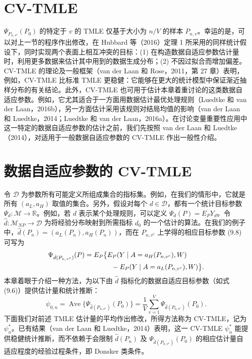\section{CV-TMLE}

$\Psi_{P_{n,v^c}}(P_0)$ 的特定于 $v$ 的 TMLE 仅基于大小为 $n/V$ 的样本 $P_{n,v}$。幸运的是，可以对上一节的程序作出修改，在 Hubbard 等（2016）定理 1 所采用的同样统计假设下，同时实现两个表面上相互冲突的目标：(1) 在构造数据自适应参数估计量时，利用更多数据来估计其中用到的数据生成分布；(2) 不因过拟合而增加偏差。CV-TMLE 的理论及一般框架（van der Laan 和 Rose，2011，第 27 章）表明，例如，CV-TMLE 比标准 TMLE 更稳健：它能够在更大的统计模型中保证渐近抽样分布的有关结论。此外，CV-TMLE 也可用于估计本章着重讨论的这类数据自适应参数。例如，它尤其适合于一方面用数据估计最优处理规则（Luedtke 和 van der Laan，2016b），另一方面估计采用该规则对结局均值的影响（van der Laan 和 Luedtke，2014；Luedtke 和 van der Laan，2016a）。在讨论变量重要性应用中这一特定的数据自适应参数的估计之前，我们先按照 van der Laan 和 Luedtke（2014），对适用于一般数据自适应参数的 CV-TMLE 作出一般性介绍。

\section{数据自适应参数的 CV-TMLE}

令 $\mathcal D$ 为参数所有可能定义所组成集合的指标集。例如，在我们的情形中，它就是所有 $(a_L,a_H)$ 取值的集合。另外，假设对每个 $d\in\mathcal D$，都有一个统计目标参数 $\Psi_d:\mathcal M\to\mathbb R$。例如，若 $d$ 表示某个处理规则，可以定义 $\Psi_d(P)=E_PY_d$。令 $\hat d:\mathcal M_{NP}\to\mathcal D$ 为将经验分布映射到所需指标 $d_0$ 的一个估计的算法。在我们的例子中，$\hat d(P_n)=(a_L(P_n),a_H(P_n))$，而在 $P_{n,v^c}$ 上学得的相应目标参数 (9.8) 可写为
\[
\begin{aligned}
\Psi_{\hat d(P_{n,v^c})}(P)
={}&E_P\bigl\{E_P(Y\mid A=a_H(P_{n,v^c}),W)\\
&\hspace{2.6em}-E_P(Y\mid A=a_L(P_{n,v^c}),W)\bigr\}.
\end{aligned}
\]
本章着眼于介绍一种方法，为以下由 $\hat d$ 指标化的数据自适应目标参数（如式 (9.6)）提供估计量和统计推断：
\[
\psi_{0,n}=\operatorname{Ave}\{\Psi_{\hat d(P_{n,v^c})}(P_0)\}
=\frac1V\sum_{v=1}^V\Psi_{\hat d(P_{n,v^c})}(P_0).
\]
下面我们对前述 TMLE 估计量的平均作出修改，所得方法称为 CV-TMLE，记为 $\psi_n^*$。已有结果（van der Laan 和 Luedtke，2014）表明，这一 CV-TMLE $\psi_n^*$ 能提供稳健统计推断，而不依赖于会限制 $\hat d(P_n)$ 及 $\Psi_{\hat d(P_{n,v^c})}(P_0)$ 的相应估计量自适应程度的经验过程条件，即 Donsker 类条件。

